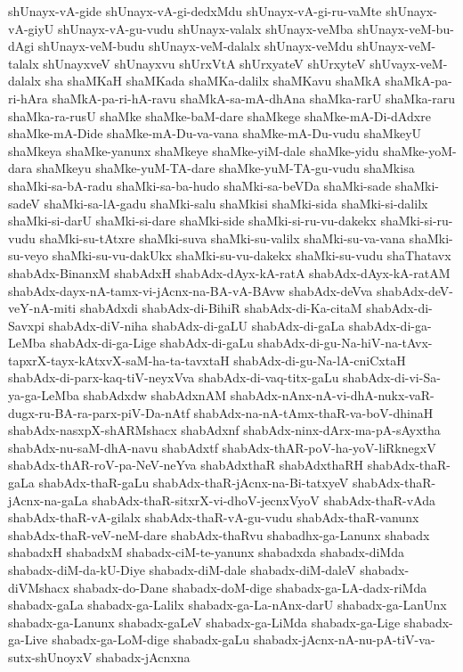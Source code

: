 {shUnayx-vA-gide
shUnayx-vA-gi-dedxMdu
shUnayx-vA-gi-ru-vaMte
shUnayx-vA-giyU
shUnayx-vA-gu-vudu
shUnayx-valalx
shUnayx-veMba
shUnayx-veM-bu-dAgi
shUnayx-veM-budu
shUnayx-veM-dalalx
shUnayx-veMdu
shUnayx-veM-talalx
shUnayxveV
shUnayxvu
shUrxVtA
shUrxyateV
shUrxyteV
shUvayx-veM-dalalx
sha
shaMKaH
shaMKada
shaMKa-dalilx
shaMKavu
shaMkA
shaMkA-pa-ri-hAra
shaMkA-pa-ri-hA-ravu
shaMkA-sa-mA-dhAna
shaMka-rarU
shaMka-raru
shaMka-ra-rusU
shaMke
shaMke-baM-dare
shaMkege
shaMke-mA-Di-dAdxre
shaMke-mA-Dide
shaMke-mA-Du-va-vana
shaMke-mA-Du-vudu
shaMkeyU
shaMkeya
shaMke-yanunx
shaMkeye
shaMke-yiM-dale
shaMke-yidu
shaMke-yoM-dara
shaMkeyu
shaMke-yuM-TA-dare
shaMke-yuM-TA-gu-vudu
shaMkisa
shaMki-sa-bA-radu
shaMki-sa-ba-hudo
shaMki-sa-beVDa
shaMki-sade
shaMki-sadeV
shaMki-sa-lA-gadu
shaMki-salu
shaMkisi
shaMki-sida
shaMki-si-dalilx
shaMki-si-darU
shaMki-si-dare
shaMki-side
shaMki-si-ru-vu-dakekx
shaMki-si-ru-vudu
shaMki-su-tAtxre
shaMki-suva
shaMki-su-valilx
shaMki-su-va-vana
shaMki-su-veyo
shaMki-su-vu-dakUkx
shaMki-su-vu-dakekx
shaMki-su-vudu
shaThatavx
shabAdx-BinanxM
shabAdxH
shabAdx-dAyx-kA-ratA
shabAdx-dAyx-kA-ratAM
shabAdx-dayx-nA-tamx-vi-jAcnx-na-BA-vA-BAvw
shabAdx-deVva
shabAdx-deV-veY-nA-miti
shabAdxdi
shabAdx-di-BihiR
shabAdx-di-Ka-citaM
shabAdx-di-Savxpi
shabAdx-diV-niha
shabAdx-di-gaLU
shabAdx-di-gaLa
shabAdx-di-ga-LeMba
shabAdx-di-ga-Lige
shabAdx-di-gaLu
shabAdx-di-gu-Na-hiV-na-tAvx-tapxrX-tayx-kAtxvX-saM-ha-ta-tavxtaH
shabAdx-di-gu-Na-lA-cniCxtaH
shabAdx-di-parx-kaq-tiV-neyxVva
shabAdx-di-vaq-titx-gaLu
shabAdx-di-vi-Sa-ya-ga-LeMba
shabAdxdw
shabAdxnAM
shabAdx-nAnx-nA-vi-dhA-nukx-vaR-dugx-ru-BA-ra-parx-piV-Da-nAtf
shabAdx-na-nA-tAmx-thaR-va-boV-dhinaH
shabAdx-nasxpX-shARMshacx
shabAdxnf
shabAdx-ninx-dArx-ma-pA-sAyxtha
shabAdx-nu-saM-dhA-navu
shabAdxtf
shabAdx-thAR-poV-ha-yoV-liRknegxV
shabAdx-thAR-roV-pa-NeV-neYva
shabAdxthaR
shabAdxthaRH
shabAdx-thaR-gaLa
shabAdx-thaR-gaLu
shabAdx-thaR-jAcnx-na-Bi-tatxyeV
shabAdx-thaR-jAcnx-na-gaLa
shabAdx-thaR-sitxrX-vi-dhoV-jecnxVyoV
shabAdx-thaR-vAda
shabAdx-thaR-vA-gilalx
shabAdx-thaR-vA-gu-vudu
shabAdx-thaR-vanunx
shabAdx-thaR-veV-neM-dare
shabAdx-thaRvu
shabadhx-ga-Lanunx
shabadx
shabadxH
shabadxM
shabadx-ciM-te-yanunx
shabadxda
shabadx-diMda
shabadx-diM-da-kU-Diye
shabadx-diM-dale
shabadx-diM-daleV
shabadx-diVMshacx
shabadx-do-Dane
shabadx-doM-dige
shabadx-ga-LA-dadx-riMda
shabadx-gaLa
shabadx-ga-Lalilx
shabadx-ga-La-nAnx-darU
shabadx-ga-LanUnx
shabadx-ga-Lanunx
shabadx-gaLeV
shabadx-ga-LiMda
shabadx-ga-Lige
shabadx-ga-Live
shabadx-ga-LoM-dige
shabadx-gaLu
shabadx-jAcnx-nA-nu-pA-tiV-va-sutx-shUnoyxV
shabadx-jAcnxna
}
